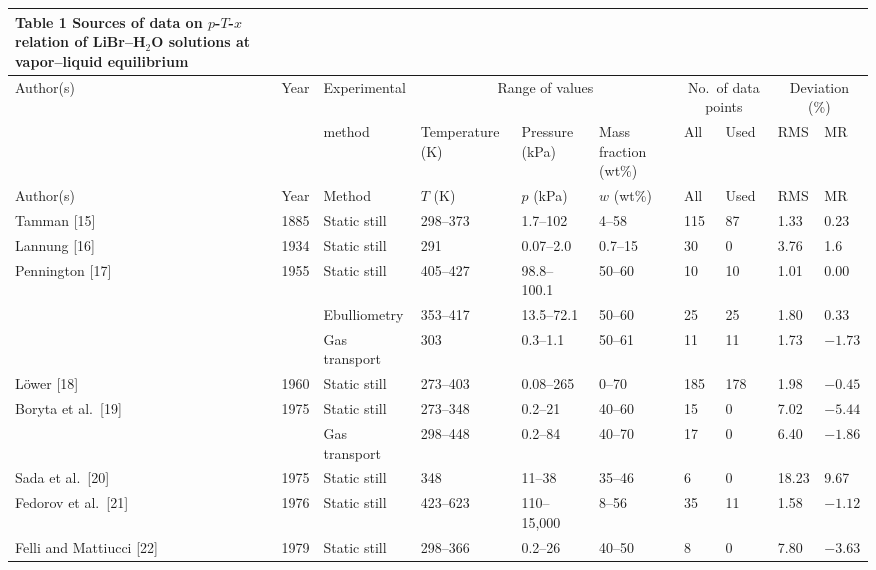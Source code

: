 \documentclass[11pt]{article}
\newcommand{\wtpc}{wt\%}
\begin{document}
\begin{landscape}
\footnotesize
\setlength{\tabcolsep}{4pt}
\begin{longtable}{llllllllll}
\caption*{Table 1\\ Sources of data on $p$-$T$-$x$ relation of
          LiBr--H$_2$O solutions at vapor--liquid equilibrium} \\
\toprule
Author(s) & Year & Experimental
 & \multicolumn{3}{c}{Range of values}
 & \multicolumn{2}{c}{No.\ of data points}
 & \multicolumn{2}{c}{Deviation (\%)} \\
\cmidrule(lr){4-6}\cmidrule(lr){7-8}\cmidrule(lr){9-10}
 & & method & Temperature (K) & Pressure (kPa) & Mass fraction (\wtpc)
 & All & Used & RMS & MR \\
\midrule
\endfirsthead
\toprule
Author(s) & Year & Method & $T$ (K) & $p$ (kPa) & $w$ (\wtpc)
 & All & Used & RMS & MR \\
\midrule
\endhead
Tamman [15]              & 1885 & Static still      & 298--373 & 1.7--102     & 4--58  & 115 & 87  & 1.33  & 0.23 \\
Lannung [16]             & 1934 & Static still      & 291      & 0.07--2.0    & 0.7--15 & 30 & 0   & 3.76  & 1.6 \\
Pennington [17]          & 1955 & Static still      & 405--427 & 98.8--100.1  & 50--60 & 10  & 10  & 1.01  & 0.00 \\
                         &      & Ebulliometry      & 353--417 & 13.5--72.1   & 50--60 & 25  & 25  & 1.80  & 0.33 \\
                         &      & Gas transport     & 303      & 0.3--1.1     & 50--61 & 11  & 11  & 1.73  & $-1.73$ \\
L\"ower [18]             & 1960 & Static still      & 273--403 & 0.08--265    & 0--70  & 185 & 178 & 1.98  & $-0.45$ \\
Boryta et al.\ [19]      & 1975 & Static still      & 273--348 & 0.2--21      & 40--60 & 15  & 0   & 7.02  & $-5.44$ \\
                         &      & Gas transport     & 298--448 & 0.2--84      & 40--70 & 17  & 0   & 6.40  & $-1.86$ \\
Sada et al.\ [20]        & 1975 & Static still      & 348      & 11--38       & 35--46 & 6   & 0   & 18.23 & 9.67 \\
Fedorov et al.\ [21]     & 1976 & Static still      & 423--623 & 110--15,000  & 8--56  & 35  & 11  & 1.58  & $-1.12$ \\
Felli and Mattiucci [22] & 1979 & Static still      & 298--366 & 0.2--26      & 40--50 & 8   & 0   & 7.80  & $-3.63$ \\

\end{longtable}
\end{landscape}
\end{document}
